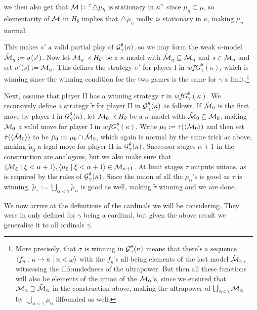 \documentclass[../../main]{subfiles}
\begin{document}
{{		we then also get that $\operatorname{\mathcal M}\models\ulcorner \triangle\mu_\eta\text{ is stationary in $\kappa$} \urcorner$ since $\mu_\eta\subset\mu$, so elementarity of $\operatorname{\mathcal M}$ in $H_\theta$ implies that $\triangle\mu_\eta$ really \textit{is} stationary in $\kappa$, making $\mu_\eta$ normal.
	}
	
	This makes $s'$ a valid partial play of $\operatorname{\mathcal G}_\gamma^\theta(\kappa)$, so we may form the weak $\kappa$-model $\tilde{\operatorname{\mathcal M}}_\eta:=\sigma(s')$. Now let $\operatorname{\mathcal M}_\eta\prec H_\theta$ be a $\kappa$-model with $\tilde{\operatorname{\mathcal M}}_\eta\subseteq\operatorname{\mathcal M}_\eta$ and $s\in\operatorname{\mathcal M}_\eta$ and set $\sigma'(s):=\operatorname{\mathcal M}_\eta$. This defines the strategy $\sigma'$ for player I in $wfG_\gamma^\theta(\kappa)$, which is winning since the winning condition for the two games is the same for $\gamma$ a limit.\footnote{More precisely, that $\sigma$ is winning in $\operatorname{\mathcal G}_\gamma^\theta(\kappa)$ means that there's a sequence $\langle f_n:\kappa\to\kappa\mid n<\omega\rangle$ with the $f_n$'s all being elements of the last model $\tilde{\operatorname{\mathcal M}}_\gamma$, witnessing the illfoundedness of the ultrapower. But then all these functions will also be elements of the union of the $\operatorname{\mathcal M}_\alpha$'s, since we ensured that $\operatorname{\mathcal M}_\alpha\supseteq\tilde{\operatorname{\mathcal M}}_\alpha$ in the construction above, making the ultrapower of $\bigcup_{\alpha<\gamma}\operatorname{\mathcal M}_\alpha$ by $\bigcup_{\alpha<\gamma}\mu_\alpha$ illfounded as well.}

	\qquad Next, assume that player II has a winning strategy $\tau$ in $wfG_\gamma^\theta(\kappa)$. We recursively define a strategy $\tilde\tau$ for player II in $\operatorname{\mathcal G}_\gamma^\theta(\kappa)$ as follows. If $\tilde{\operatorname{\mathcal M}}_0$ is the first move by player I in $\operatorname{\mathcal G}_\gamma^\theta(\kappa)$, let $\operatorname{\mathcal M}_0\prec H_\theta$ be a $\kappa$-model with $\tilde{\operatorname{\mathcal M}}_0\subseteq\operatorname{\mathcal M}_0$, making $\operatorname{\mathcal M}_0$ a valid move for player I in $wfG_\gamma^\theta(\kappa)$. Write $\mu_0:=\tau(\langle \operatorname{\mathcal M}_0\rangle)$ and then set $\tilde\tau(\langle \tilde{\operatorname{\mathcal M}}_0\rangle)$ to be $\tilde\mu_0:=\mu_0\cap\tilde{\operatorname{\mathcal M}}_0$, which again is normal by the same trick as above, making $\tilde\mu_0$ a legal move for player II in $\operatorname{\mathcal G}_\gamma^\theta(\kappa)$. Successor stages $\alpha+1$ in the construction are analogous, but we also make sure that $\langle \operatorname{\mathcal M}_\xi\mid\xi<\alpha+1\rangle,\langle \mu_\xi\mid\xi<\alpha+1\rangle\in\operatorname{\mathcal M}_{\alpha+1}$. At limit stages $\tau$ outputs unions, as is required by the rules of $\operatorname{\mathcal G}_\gamma^\theta(\kappa)$. Since the union of all the $\mu_\alpha$'s is good as $\tau$ is winning, $\tilde\mu_\gamma:=\bigcup_{\alpha<\gamma}\tilde\mu_\alpha$ is good as well, making $\tilde\tau$ winning and we are done.
}

We now arrive at the definitions of the cardinals we will be considering. They were in \cite{HolySchlicht} only defined for $\gamma$ being a cardinal, but given the above result we generalise it to all ordinals $\gamma$.
\end{document}
